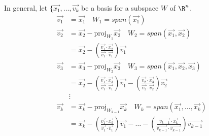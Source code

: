 \documentclass{math}
\begin{document}
In general, let \( \{\vec{x_1},\dots,\vec{v_k} \) be a basis for a subspace
\( W \) of \( \R^n \).
\begin{align*}
  \vec{v_1} &= \vec{x_1} \quad W_1 = span(\vec{x_1}) \\
  \vec{v_2} &= \vec{x_2}-\text{proj}_{W_1}\vec{x_2} \quad
    W_2 = span(\vec{x_1},\vec{x_2}) \\
  &= \vec{x_2}-
    \left(\frac{\vec{v_1}\cdot\vec{x_2}}{\vec{v_1}\cdot\vec{v_1}}\right)
    \vec{v_1} \\
  \vec{v_3} &= \vec{x_3}-\text{proj}_{W_2}\vec{x_3} \quad
    W_3 = span(\vec{x_1},\vec{x_2},\vec{x_3}) \\
  &= \vec{x_2}-
    \left(\frac{\vec{v_1}\cdot\vec{x_3}}{\vec{v_1}\cdot\vec{v_1}}\right)
    \vec{v_1}-
    \left(\frac{\vec{v_2}\cdot\vec{x_3}}{\vec{v_2}\cdot\vec{v_2}}\right)
    \vec{v_2} \\
  &\vdots \\
  \vec{v_k} &= \vec{x_k}-\text{proj}_{W_{k-1}}\vec{x_k} \quad
    W_k = span(\vec{x_1},\dots,\vec{x_k}) \\
  &= \vec{x_k}-
    \left(\frac{\vec{v_1}\cdot\vec{x_k}}{\vec{v_1}\cdot\vec{v_1}}\right)
    \vec{v_1}-\dots-
    \left(\frac{\vec{v_{k-1}}\cdot\vec{x_k}}{\vec{v_{k-1}}\cdot\vec{v_{k-1}}}
    \right)\vec{v_{k-1}} \\
\end{align*}
\end{document}
